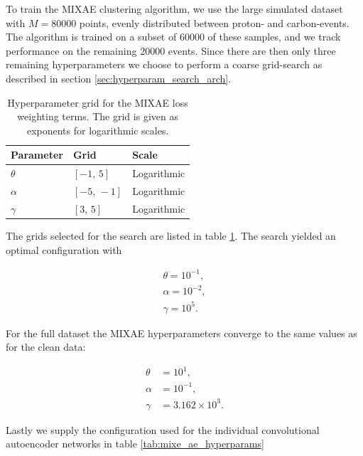 \documentclass[review,number,sort&compress]{elsarticle}
\begin{document}
To train the MIXAE clustering algorithm, we use the large simulated dataset with $M=80000$ points, evenly distributed between proton- and carbon-events. The algorithm is trained on a subset of $60000$ of these samples, and we track performance on the remaining $20000$ events. Since there are then only three remaining hyperparameters we choose to perform a coarse grid-search as described in section \ref{sec:hyperparam_search_arch}.

\begin{table}
\centering
\caption{Hyperparameter grid for the MIXAE loss weighting terms. The grid is given as exponents for logarithmic scales.}\label{tab:mixae_loss_weights}
\begin{tabular}{lll}
\toprule
Parameter & Grid & Scale \\
\midrule 
$\theta$ & $[-1,\, 5]$ & Logarithmic \\
$\alpha$ & $[-5,\, -1]$ & Logarithmic \\
$\gamma$ & $[3,\, 5]$ & Logarithmic
\end{tabular}
\end{table}

The grids selected for the search are listed in table \ref{tab:mixae_loss_weights}. The search yielded an optimal configuration with 

\begin{align}
\theta = 10^{-1}, \\
\alpha = 10^{-2}, \\
\gamma = 10^5.
\end{align}

For the full dataset the MIXAE hyperparameters converge to the same values as for the clean data:

\begin{align}
\theta &= 10^{1}, \\
\alpha &= 10^{-1}, \\
\gamma &= 3.162\times 10^3.
\end{align}

Lastly we supply the configuration used for the individual convolutional autoencoder networks in table \ref{tab:mixe_ae_hyperparams}
\end{document}
